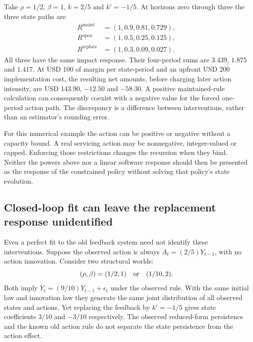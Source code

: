 Take $\rho=1/2$, $\beta=1$, $k=2/5$ and $k'=-1/5$. At horizons
zero through three the three state paths are
\begin{align}
 R^{\mathrm{maint}}&=(1,0.9,0.81,0.729),\nonumber\\
 R^{\mathrm{open}}&=(1,0.5,0.25,0.125),\nonumber\\
 R^{\mathrm{replace}}&=(1,0.3,0.09,0.027).
 \label{exec17:s6-feedback-paths}
\end{align}
All three have the same impact response. Their four-period sums are
$3.439$, $1.875$ and $1.417$. At USD 100 of margin per state-period
and an upfront USD 200 implementation cost, the resulting net amounts,
before charging later action intensity, are USD 143.90, $-12.50$ and
$-58.30$. A positive maintained-rule calculation can consequently coexist
with a negative value for the forced one-period action path. The discrepancy
is a difference between interventions, rather than an estimator's rounding
error.\citep{exec17_s6_math}

For this numerical example the action can be positive or negative without a
capacity bound. A real servicing action may be nonnegative, integer-valued or
capped. Enforcing those restrictions changes the recursion when they bind.
Neither the powers above nor a linear software response should then be
presented as the response of the constrained policy without solving that
policy's state evolution.

\subsection{Closed-loop fit can leave the replacement response unidentified}

Even a perfect fit to the old feedback system need not identify these
interventions. Suppose the observed action is always $A_t=(2/5)Y_{t-1}$,
with no action innovation. Consider two structural worlds:
\begin{equation}
 (\rho,\beta)=(1/2,1)\quad\hbox{or}\quad(1/10,2).
 \label{exec17:s6-two-worlds}
\end{equation}
Both imply $Y_t=(9/10)Y_{t-1}+\epsilon_t$ under the observed rule.
With the same initial law and innovation law they generate the same joint
distribution of all observed states and actions. Yet replacing the feedback
by $k'=-1/5$ gives state coefficients $3/10$ and $-3/10$ respectively.
The observed reduced-form persistence and the known old action rule do not
separate the state persistence from the action effect.

